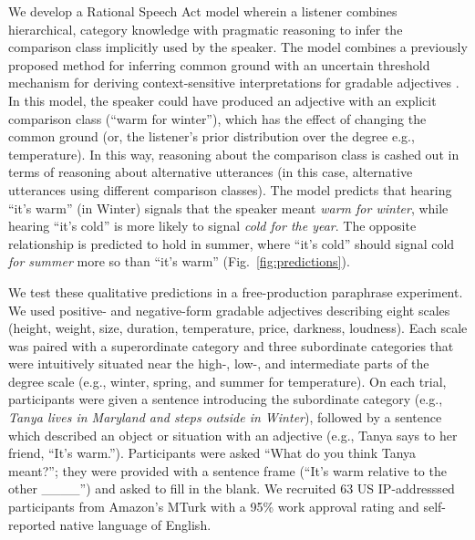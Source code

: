 \documentclass[letterpaper, 12pt]{article}
\begin{document}
We develop a Rational Speech Act model wherein a listener combines hierarchical, category knowledge with pragmatic reasoning to infer the comparison class implicitly used by the speaker.
The model combines a previously proposed method for inferring common ground \cite{Degen2015} with an uncertain threshold mechanism for deriving context-sensitive interpretations for gradable adjectives \cite{Lassiter2015}.
In this model, the speaker could have produced an adjective with an explicit comparison class (``warm for winter''), which has the effect of changing the common ground (or, the listener's prior distribution over the degree e.g., temperature).
In this way, reasoning about the comparison class is cashed out in terms of reasoning about alternative utterances (in this case, alternative utterances using different comparison classes).
The model predicts that hearing \enquote{it's warm} (in Winter) signals that the speaker meant \emph{warm for winter}, while hearing \enquote{it's cold} is more likely to signal \emph{cold for the year}. 
The opposite relationship is predicted to hold in summer, where \enquote{it's cold} should signal cold \emph{for summer} more so than \enquote{it's warm} (Fig.~\ref{fig:predictions}). 

We test these qualitative predictions in a free-production paraphrase experiment.
We used positive- and negative-form gradable adjectives describing eight scales (height, weight, size, duration, temperature, price, darkness, loudness). 
Each scale was paired with a superordinate category and three subordinate categories that were intuitively situated near the high-, low-, and intermediate parts of the degree scale (e.g., winter, spring, and summer for temperature). 
On each trial, participants were given a sentence introducing the subordinate category (e.g., \emph{Tanya lives in Maryland and steps outside in Winter}), followed by a sentence which described an object or situation with an adjective (e.g., Tanya says to her friend, ``It’s warm.''). 
Participants were asked ``What do you think Tanya meant?''; they were provided with a sentence frame (``It's warm relative to the other \_\_\_\_'') and asked to fill in the blank.
We recruited 63 US IP-addresssed participants from Amazon's MTurk with a 95\% work approval rating and self-reported native language of English.
\end{document}
